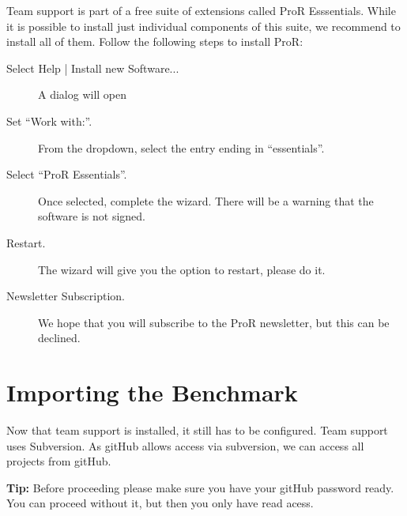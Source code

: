\documentclass{template/openetcs_report}
\begin{document}
Team support is part of a free suite of extensions called ProR Esssentials.  While it is possible to install just individual components of this suite, we recommend to install all of them.  Follow the following steps to install ProR:

\begin{description}

\item[Select Help | Install new Software...] A dialog will open

\item[Set ``Work with:''.]  From the dropdown, select the entry ending in ``essentials''.

\item[Select ``ProR Essentials''.]  Once selected, complete the wizard.  There will be a warning that the software is not signed.

\item[Restart.] The wizard will give you the option to restart, please do it.

\item[Newsletter Subscription.] We hope that you will subscribe to the ProR newsletter, but this can be declined.

\end{description}

\section{Importing the Benchmark}

Now that team support is installed, it still has to be configured.  Team support uses Subversion.  As gitHub allows access via subversion, we can access all projects from gitHub.

\textbf{Tip:} Before proceeding please make sure you have your gitHub password ready.  You can proceed without it, but then you only have read acess.
\end{document}

